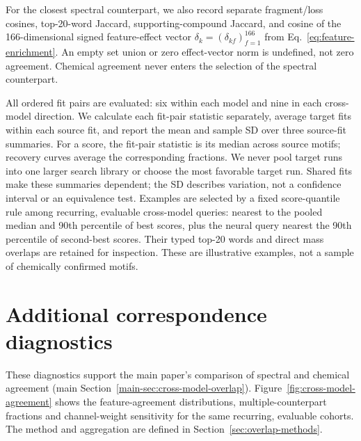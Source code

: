 \documentclass[10pt,a4paper]{article}
\begin{document}
For the closest spectral counterpart, we also record separate fragment/loss
cosines, top-20-word Jaccard, supporting-compound Jaccard, and cosine of the
166-dimensional signed feature-effect vector
$\delta_k=(\delta_{kf})_{f=1}^{166}$ from
Eq.~\ref{eq:feature-enrichment}. An empty set union or zero effect-vector
norm is undefined, not zero agreement. Chemical agreement never enters the
selection of the spectral counterpart.

All ordered fit pairs are evaluated: six within each model and nine in each
cross-model direction. We calculate each fit-pair statistic separately,
average target fits within each source fit, and report the mean and sample
SD over three source-fit summaries. For a score, the fit-pair statistic is
its median across source motifs; recovery curves average the corresponding
fractions. We never pool target runs into one larger search library or choose
the most favorable target run. Shared fits make these summaries dependent;
the SD describes variation, not a confidence interval or an equivalence test.
Examples are selected by a fixed score-quantile rule among recurring,
evaluable cross-model queries: nearest to the pooled median and 90th percentile
of best scores, plus the neural query nearest the 90th percentile of
second-best scores. Their typed top-20 words and direct mass overlaps are
retained for inspection. These are illustrative examples, not a sample of
chemically confirmed motifs.


\section{Additional correspondence diagnostics}
\label{sec:diagnostics}

These diagnostics support the main paper's comparison of spectral and chemical
agreement (main Section~\ref{main-sec:cross-model-overlap}). Figure~\ref{fig:cross-model-agreement}
shows the feature-agreement distributions, multiple-counterpart fractions and
channel-weight sensitivity for the same recurring, evaluable cohorts. The
method and aggregation are defined in Section~\ref{sec:overlap-methods}.
\end{document}

